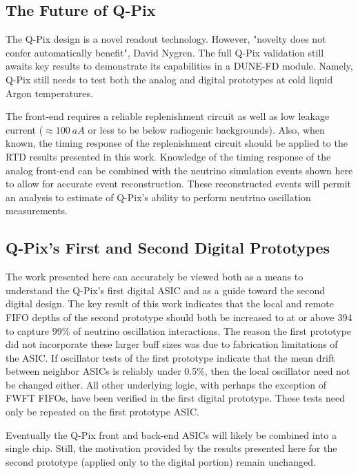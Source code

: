\subsection{The Future of Q-Pix}

The Q-Pix design is a novel readout technology.
However, "novelty does not confer automatically benefit", David Nygren.
The full Q-Pix validation still awaits key results to demonstrate its capabilities in a DUNE-FD module.
Namely, Q-Pix still needs to test both the analog and digital prototypes at cold liquid Argon temperatures.

The front-end requires a reliable replenishment circuit as well as low leakage current ($\approx 100~\unit{aA}$ or less to be below radiogenic backgrounds).
Also, when known, the timing response of the replenishment circuit should be applied to the RTD results presented in this work.
Knowledge of the timing response of the analog front-end can be combined with the neutrino simulation events shown here to allow for accurate event reconstruction.
These reconstructed events will permit an analysis to estimate of Q-Pix's ability to perform neutrino oscillation measurements.

\subsection{Q-Pix's First and Second Digital Prototypes}

The work presented here can accurately be viewed both as a means to understand the Q-Pix's first digital ASIC and as a guide toward the second digital design.
The key result of this work indicates that the local and remote FIFO depths of the second prototype should both be increased to at or above 394 to capture 99\% of neutrino oscillation interactions.
The reason the first prototype did not incorporate these larger buff sizes was due to fabrication limitations of the ASIC.
If oscillator tests of the first prototype indicate that the mean drift between neighbor ASICs is reliably under 0.5\%, then the local oscillator need not be changed either.
All other underlying logic, with perhaps the exception of FWFT FIFOs, have been verified in the first digital prototype.
These tests need only be repeated on the first prototype ASIC.

Eventually the Q-Pix front and back-end ASICs will likely be combined into a single chip.
Still, the motivation provided by the results presented here for the second prototype (applied only to the digital portion) remain unchanged.
